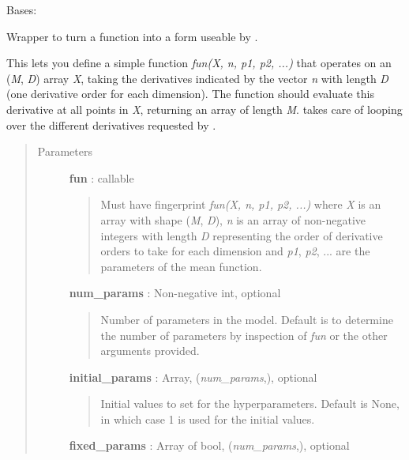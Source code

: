 \documentclass[letterpaper,10pt,english]{sphinxmanual}
\begin{document}
\begin{fulllineitems}
\label{gptools:gptools.mean.MeanFunction}
Bases: 

Wrapper to turn a function into a form useable by .

This lets you define a simple function \emph{fun(X, n, p1, p2, ...)} that
operates on an (\emph{M}, \emph{D}) array \emph{X}, taking the derivatives indicated by the
vector \emph{n} with length \emph{D} (one derivative order for each dimension). The
function should evaluate this derivative at all points in \emph{X}, returning an
array of length \emph{M}. {\hyperref[gptools:gptools.mean.MeanFunction]{}} takes care of looping over the
different derivatives requested by .
\begin{quote}\begin{description}
\item[{Parameters}] \leavevmode
\textbf{fun} : callable
\begin{quote}

Must have fingerprint \emph{fun(X, n, p1, p2, ...)} where \emph{X} is an array
with shape (\emph{M}, \emph{D}), \emph{n} is an array of non-negative integers with
length \emph{D} representing the order of derivative orders to take for each
dimension and \emph{p1}, \emph{p2}, ... are the parameters of the mean function.
\end{quote}

\textbf{num\_params} : Non-negative int, optional
\begin{quote}

Number of parameters in the model. Default is to determine the number of
parameters by inspection of \emph{fun} or the other arguments provided.
\end{quote}

\textbf{initial\_params} : Array, (\emph{num\_params},), optional
\begin{quote}

Initial values to set for the hyperparameters. Default is None, in
which case 1 is used for the initial values.
\end{quote}

\textbf{fixed\_params} : Array of bool, (\emph{num\_params},), optional
\begin{quote}


\end{quote}
\end{description}
\end{quote}
\end{fulllineitems}
\end{document}
